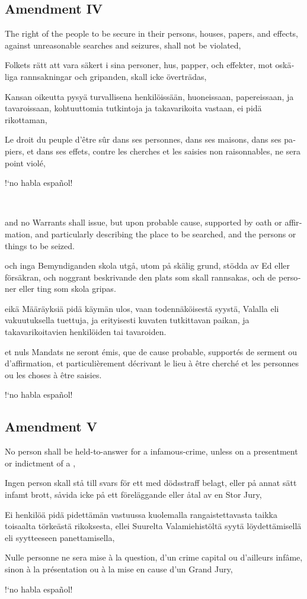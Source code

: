 \documentclass[a4paper,landscape,10pt]{article}
\newcommand{\tblock}[5]{\noindent\begin{minipage}[t]{0.18\textwidth}\foreignlanguage{english}{#1}\end{minipage}\hskip 0.025\textwidth\begin{minipage}[t]{0.18\textwidth}\foreignlanguage{swedish}{#2}\end{minipage}\hskip 0.025\textwidth\begin{minipage}[t]{0.18\textwidth}\foreignlanguage{finnish}{#3}\end{minipage}\hskip 0.025\textwidth\begin{minipage}[t]{0.18\textwidth}\foreignlanguage{french}{#4}\end{minipage}\hskip 0.025\textwidth\begin{minipage}[t]{0.18\textwidth}\foreignlanguage{spanish}{#5}\end{minipage}}
\begin{document}
\subsection*{Amendment IV}
\tblock
{The right of the people to be secure in their persons, houses, papers, and effects, against unreasonable searches and seizures, shall not be violated,}
{Folkets rätt att vara säkert i sina personer, hus, papper, och effekter, mot oskäliga rannsakningar och gripanden, skall icke överträdas,}
{Kansan oikeutta pysyä turvallisena henkilöissään, huoneissaan, papereissaan, ja tavaroissaan, kohtuuttomia tutkintoja ja takavarikoita vastaan, ei pidä rikottaman,}
{Le droit du peuple d'être sûr dans ses personnes, dans ses maisons, dans ses papiers, et dans ses effets, contre les cherches et les saisies non raisonnables, ne sera point violé,}
{!`no habla español!}

~

\tblock
{and no Warrants shall issue, but upon probable cause, supported by \Gls{oath} or \gls{affirmation}, and particularly describing the place to be searched, and the persons or things to be seized.}
{och inga Bemyndiganden skola utgå, utom på skälig grund, stödda av Ed eller försäkran, och noggrant beskrivande den plats som skall rannsakas, och de personer eller ting som skola gripas.}
{eikä Määräyksiä pidä käymän ulos, vaan todennäköisestä syystä, Valalla eli vakuutuksella tuettuja, ja erityisesti kuvaten tutkittavan paikan, ja takavarikoitavien henkilöiden tai tavaroiden.}
{et nuls Mandats ne seront émis, que de cause probable, supportés de serment ou d'affirmation, et particulièrement décrivant le lieu à être cherché et les personnes ou les choses à être saisies.}
{!`no habla español!}

\subsection*{Amendment V}
\tblock
{No person shall be \gls{held-to-answer} for a \gls{infamous-crime}, unless on a \gls{presentment} or \gls{indictment} of a \glslink{grand-jury}{Grand Jury},}
{Ingen person skall stå till svars för ett med dödsstraff belagt, eller på annat sätt infamt brott, såvida icke på ett föreläggande eller åtal av en Stor Jury,}
{Ei henkilöä pidä pidettämän vastuussa kuolemalla rangaistettavasta taikka toisaalta törkeästä rikoksesta, ellei Suurelta Valamiehistöltä syytä löydettämisellä eli syytteeseen panettamisella,}
{Nulle personne ne sera mise à la question, d'un crime capital ou d'ailleurs infâme, sinon à la présentation ou à la mise en cause d'un Grand Jury,}
{!`no habla español!}
\end{document}
